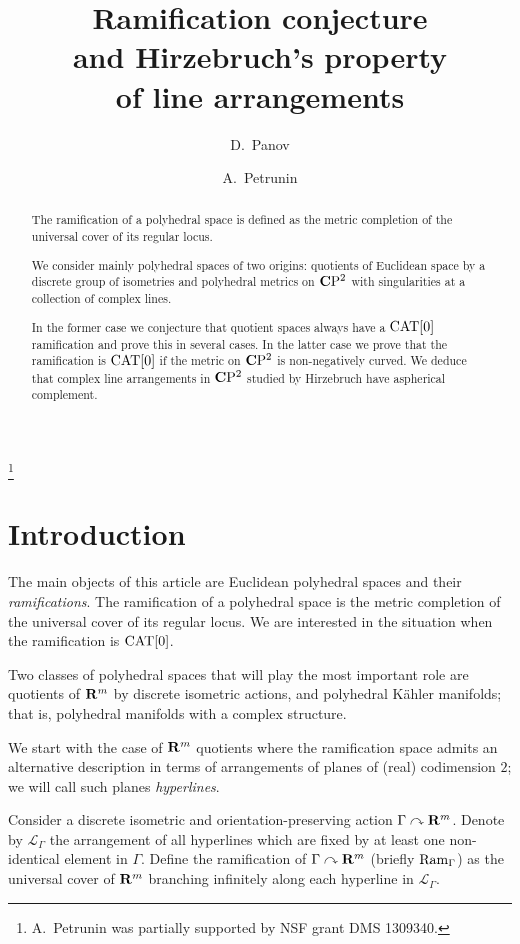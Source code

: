 \documentclass{compositio}
\begin{document}
\title{Ramification conjecture\\ 
and Hirzebruch's property\\ of line arrangements}
\author{D.~Panov}
\author{A.~Petrunin}
\date{}
\thanks{A.~Petrunin was partially supported by NSF grant DMS 1309340.}
\begin{abstract}
The ramification of a polyhedral space is defined as the metric completion of the universal cover of its regular locus.

We consider mainly 
polyhedral spaces of two origins: quotients of Euclidean space by a discrete group of isometries and polyhedral metrics on $\mathbf{C}\mathrm{P}^2$ with singularities at a collection of complex lines. 

In the former case we conjecture that quotient spaces always have a $\mathrm{CAT}[0]$ ramification and prove this in several cases.  In the latter case  we prove that the ramification is $\mathrm{CAT}[0]$ if the metric on $\mathbf{C}\mathrm{P}^2$ is non-negatively curved. We deduce that complex line arrangements in $\mathbf{C}\mathrm{P}^2$ studied by Hirzebruch have aspherical complement.
\end{abstract}
\maketitle


\section{Introduction}

The main objects of this article are Euclidean polyhedral spaces and their \emph {ramifications}. The ramification  of a polyhedral space is the metric completion of the universal cover of its regular locus. We are interested in the situation when the ramification is $\mathrm{CAT}[0]$. 

Two classes of polyhedral spaces that will play the most important role are quotients of $\mathbf{R}^m$ by discrete isometric actions, and polyhedral K\"ahler manifolds; 
that is, polyhedral manifolds with a complex structure. 

We start with the case of $\mathbf{R}^m$ quotients where the ramification space admits an alternative description in terms of  arrangements of planes of (real) codimension $2$;
we will call such planes \emph{hyperlines}.

Consider a discrete isometric and orientation-preserving action $\Gamma\curvearrowright\mathbf{R}^m$.
Denote by $\mathcal{L}_\Gamma$ the arrangement of all hyperlines which are fixed by at least one non-identical element in $\Gamma$. Define the ramification of $\Gamma\curvearrowright\mathbf{R}^m$
(briefly $\mathop{\rm Ram}\nolimits_\Gamma$)
as the universal cover of $\mathbf{R}^m$  branching infinitely  along each hyperline in $\mathcal{L}_\Gamma$.
\end{document}
